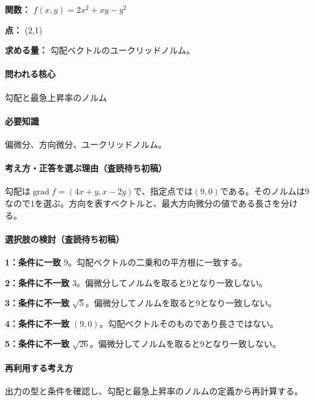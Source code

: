 \noindent\textbf{関数：} \(f(x,y)=2x^2+xy-y^2\)\par

\noindent\textbf{点：} (2,1)\par

\noindent\textbf{求める量：} 勾配ベクトルのユークリッドノルム。\par

\paragraph{問われる核心} 勾配と最急上昇率のノルム

\paragraph{必要知識} 偏微分、方向微分、ユークリッドノルム。

\paragraph{考え方・正答を選ぶ理由（査読待ち初稿）} 勾配は\(\operatorname{grad}f=(4x+y,x-2y)\)で、指定点では\((9,0)\)である。そのノルムは\(9\)なので1を選ぶ。方向を表すベクトルと、最大方向微分の値である長さを分ける。

\paragraph{選択肢の検討（査読待ち初稿）}\mbox{}\par

\noindent\textbf{1：条件に一致} \(9\)。勾配ベクトルの二乗和の平方根に一致する。\par

\noindent\textbf{2：条件に不一致} \(3\)。偏微分してノルムを取ると9となり一致しない。\par

\noindent\textbf{3：条件に不一致} \(\sqrt5\)。偏微分してノルムを取ると9となり一致しない。\par

\noindent\textbf{4：条件に不一致} \((9,0)\)。勾配ベクトルそのものであり長さではない。\par

\noindent\textbf{5：条件に不一致} \(\sqrt{26}\)。偏微分してノルムを取ると9となり一致しない。\par

\paragraph{再利用する考え方} 出力の型と条件を確認し、勾配と最急上昇率のノルムの定義から再計算する。

